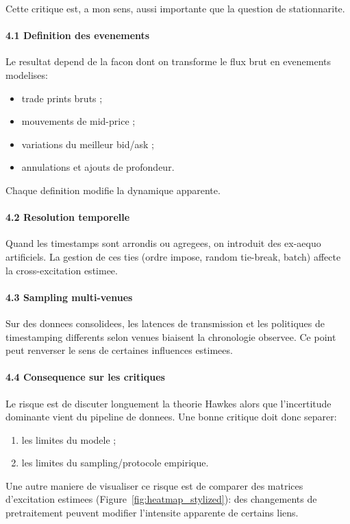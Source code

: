 \documentclass[11pt,a4paper]{article}
\begin{document}
Cette critique est, a mon sens, aussi importante que la question de stationnarite.

\paragraph{4.1 Definition des evenements}
Le resultat depend de la facon dont on transforme le flux brut en evenements modelises:
\begin{itemize}[leftmargin=1.2cm]
    \item trade prints bruts ;
    \item mouvements de mid-price ;
    \item variations du meilleur bid/ask ;
    \item annulations et ajouts de profondeur.
\end{itemize}
Chaque definition modifie la dynamique apparente.

\paragraph{4.2 Resolution temporelle}
Quand les timestamps sont arrondis ou agregees, on introduit des ex-aequo artificiels. La gestion de ces ties (ordre impose, random tie-break, batch) affecte la cross-excitation estimee.

\paragraph{4.3 Sampling multi-venues}
Sur des donnees consolidees, les latences de transmission et les politiques de timestamping differents selon venues biaisent la chronologie observee. Ce point peut renverser le sens de certaines influences estimees.

\paragraph{4.4 Consequence sur les critiques}
Le risque est de discuter longuement la theorie Hawkes alors que l'incertitude dominante vient du pipeline de donnees. Une bonne critique doit donc separer:
\begin{enumerate}[leftmargin=1.2cm]
    \item les limites du modele ;
    \item les limites du sampling/protocole empirique.
\end{enumerate}

Une autre maniere de visualiser ce risque est de comparer des matrices d'excitation estimees (Figure~\ref{fig:heatmap_stylized}): des changements de pretraitement peuvent modifier l'intensite apparente de certains liens.
\end{document}

